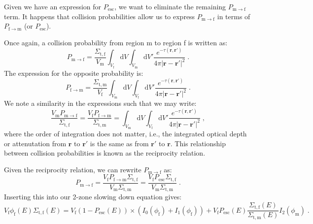 Given we have an expression for $P_\mathrm{esc}$, we want to eliminate the remaining $P_{\mathrm{m}\rightarrow\mathrm{f}}$ term. It happens that collision probabilities allow us to express $P_{\mathrm{m}\rightarrow\mathrm{f}}$ in terms of $P_{\mathrm{f}\rightarrow\mathrm{m}}$ (or $P_\mathrm{esc}$).

Once again, a collision probability from region m to region f is written as:
\begin{equation*}
    P_{\mathrm{m}\rightarrow\mathrm{f}} = \frac{\Sigma_{\mathrm{t,f}}}{V_\mathrm{m}}\int_{V_\mathrm{f}}\mathrm{d}V\int_{V_\mathrm{m}}\mathrm{d}V'\frac{e^{-\tau(\mathbf{r},\mathbf{r}')}}{4\pi|\mathbf{r}-\mathbf{r}'|^2}\;\mathrm{.}
\end{equation*}
The expression for the opposite probability is:
\begin{equation*}
    P_{\mathrm{f}\rightarrow\mathrm{m}} = \frac{\Sigma_{\mathrm{t,m}}}{V_\mathrm{f}}\int_{V_\mathrm{m}}\mathrm{d}V\int_{V_\mathrm{f}}\mathrm{d}V'\frac{e^{-\tau(\mathbf{r},\mathbf{r}')}}{4\pi|\mathbf{r}-\mathbf{r}'|^2}\;\mathrm{.}
\end{equation*}
We note a similarity in the expressions such that we may write:
\begin{equation*}
    \frac{V_\mathrm{m}P_{\mathrm{m}\rightarrow\mathrm{f}}}{\Sigma_{\mathrm{t,f}}} = \frac{V_\mathrm{f}P_{\mathrm{f}\rightarrow\mathrm{m}}}{\Sigma_{\mathrm{t,m}}} = \int_{V_\mathrm{m}}\mathrm{d}V\int_{V_\mathrm{f}}\mathrm{d}V'\frac{e^{-\tau(\mathbf{r},\mathbf{r}')}}{4\pi|\mathbf{r}-\mathbf{r}'|^2}\;\mathrm{,}
\end{equation*}
where the order of integration does not matter, i.e., the integrated optical depth or attenutation from $\mathbf{r}$ to $\mathbf{r}'$ is the same as from $\mathbf{r}'$ to $\mathbf{r}$. This relationship between collision probabilities is known as the reciprocity relation.

Given the reciprocity relation, we can rewrite  $P_{\mathrm{m}\rightarrow\mathrm{f}}$ as:
\begin{equation*}
     P_{\mathrm{m}\rightarrow\mathrm{f}} = \frac{V_\mathrm{f}P_{\mathrm{f}\rightarrow\mathrm{m}}\Sigma_{\mathrm{t,f}}}{V_\mathrm{m}\Sigma_{\mathrm{t,m}}} = \frac{V_\mathrm{f}P_{\mathrm{esc}}\Sigma_{\mathrm{t,f}}}{V_\mathrm{m}\Sigma_{\mathrm{t,m}}}\;\mathrm{.}
\end{equation*}
Inserting this into our 2-zone slowing down equation gives:
\begin{equation*}
    V_\mathrm{f}\phi_\mathrm{f}(E)\Sigma_\mathrm{t,f}(E) = V_\mathrm{f}(1-P_{\mathrm{esc}}(E))\times(I_0(\phi_\mathrm{f}) + I_1(\phi_\mathrm{f})) + V_\mathrm{f}P_{\mathrm{esc}}(E)\frac{\Sigma_{\mathrm{t,f}}(E)}{\Sigma_\mathrm{t,m}(E)}I_2(\phi_\mathrm{m})\;\mathrm{.}
\end{equation*}

